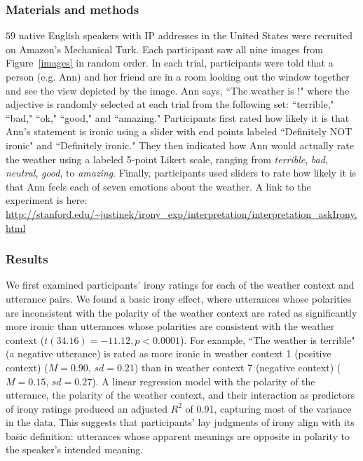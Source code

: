 \documentclass[10pt,letterpaper]{article}
\begin{document}
\subsubsection{Materials and methods}
$59$ native English speakers with IP addresses in the United States were recruited on Amazon's Mechanical Turk. Each participant saw all nine images from Figure~\ref{images} in random order. In each trial, participants were told that a person (e.g. Ann) and her friend are in a room looking out the window together and see the view depicted by the image. Ann says, ``The weather is \underline{\hspace{1cm}}!" where the adjective is randomly selected at each trial from the following set: ``terrible," ``bad," ``ok," ``good," and ``amazing." Participants first rated how likely it is that Ann's statement is ironic using a slider with end points labeled ``Definitely NOT ironic" and ``Definitely ironic." They then indicated how Ann would actually rate the weather using a labeled 5-point Likert scale, ranging from \emph{terrible}, \emph{bad}, \emph{neutral}, \emph{good}, to \emph{amazing}. Finally, participants used sliders to rate how likely it is that Ann feels each of seven emotions about the weather. A link to the experiment is here: \url{http://stanford.edu/~justinek/irony_exp/interpretation/interpretation_askIrony.html}

\subsubsection{Results}
We first examined participants' irony ratings for each of the weather context and utterance pairs. We found a basic irony effect, where utterances whose polarities are inconsistent with the polarity of the weather context are rated as significantly more ironic than utterances whose polarities are consistent with the weather context ($t(34.16)= -11.12, p < 0.0001$). For example, ``The weather is terrible" (a negative utterance) is rated as more ironic in weather context 1 (positive context) ($M = 0.90$, $sd = 0.21$) than in weather context 7 (negative context) ($M =0.15$,	$sd = 0.27$). A linear regression model with the polarity of the utterance, the polarity of the weather context, and their interaction as predictors of irony ratings produced an adjusted $R^{2}$ of 0.91, capturing most of the variance in the data. This suggests that participants' lay judgments of irony align with its basic definition: utterances whose apparent meanings are opposite in polarity to the speaker's intended meaning.
\end{document}

